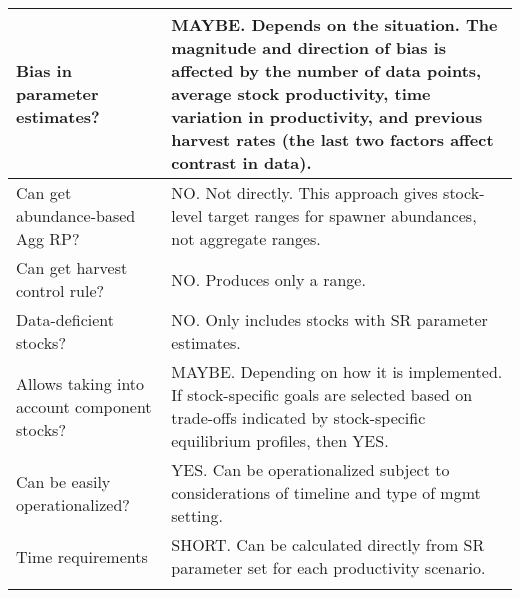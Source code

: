 \documentclass[french,11pt]{book}
\begin{document}
\begin{longtable}[t]{>{\raggedright\arraybackslash}p{9em}>{\raggedright\arraybackslash}p{37em}}
\midrule Bias in parameter estimates? & MAYBE.  Depends on the situation. The magnitude and direction of bias is affected by the number of data points, average stock productivity, time variation in productivity, and previous harvest rates (the last two factors affect contrast in data).\\
\midrule Can get abundance-based Agg RP? & NO. Not directly. This approach gives stock-level target ranges for spawner abundances, not aggregate ranges.\\
\midrule Can get harvest control rule? & NO.  Produces only a range.\\
\midrule Data-deficient stocks? & NO. Only includes stocks with SR parameter estimates.\\
\midrule Allows taking into account component stocks? & MAYBE. Depending on how it is implemented. If stock-specific goals are selected based on trade-offs indicated by stock-specific equilibrium profiles, then YES.\\
\midrule Can be easily operationalized? & YES. Can be operationalized subject to considerations of timeline and type of mgmt setting.\\
\midrule Time requirements & SHORT. Can be calculated directly from SR parameter set for each productivity scenario.\\* \end{longtable}

\endgroup{} \endgroup{}

\clearpage
\end{document}
